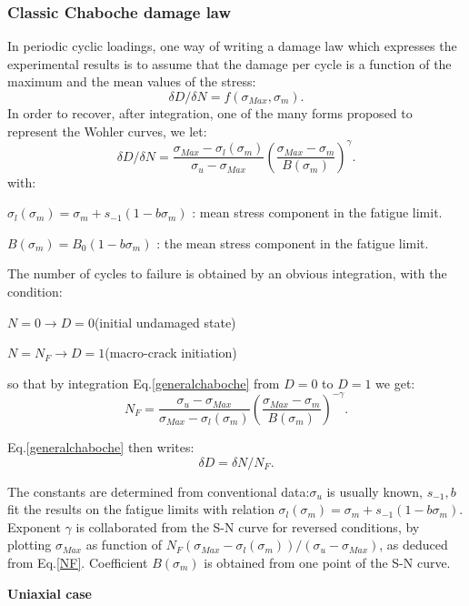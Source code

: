 \documentclass[3p,times,procedia,number]{elsarticle}
\begin{document}
\subsubsection{Classic Chaboche damage law}

In periodic cyclic loadings, one way of writing a damage law which expresses the experimental results is to assume that the damage per cycle is a function of the maximum and the mean values of the stress:
$$\delta D/\delta N=f(\sigma_{Max},\sigma_m).$$
In order to recover, after integration, one of the many forms proposed to represent the Wohler curves, we let:
\begin{equation}
\delta D/\delta N=\frac{\sigma_{Max}-\sigma_l(\sigma_m)}{\sigma_{u}-\sigma_{Max}}(\frac{\sigma_{Max}-\sigma_m}{B(\sigma_m)})^{\gamma}.
\label{generalchaboche}
\end{equation}
with:

$\sigma_l(\sigma_m)=\sigma_m+s_{-1}(1-b\sigma_m)$ : mean stress component in the fatigue limit.

$B(\sigma_m)=B_0(1-b\sigma_m)$ : the mean stress component in the fatigue limit.

The number of cycles to failure is obtained by an obvious integration, with the condition:

$N=0 \to D=0$(initial undamaged state)

$N=N_F \to D=1$(macro-crack initiation)

so that by integration Eq.\eqref{generalchaboche} from $D=0$ to $D=1$ we get:
\begin{equation}N_F=\frac{\sigma_{u}-\sigma_{Max}}{\sigma_{Max}-\sigma_l(\sigma_m)}\left(\frac{\sigma_{Max}-\sigma_m}{B(\sigma_m)}\right)^{-\gamma}.
\label{NF}
\end{equation}

Eq.\eqref{generalchaboche} then writes:
$$\delta D=\delta N/N_F.$$

The constants are determined from conventional data:$\sigma_u$ is usually known, $s_{-1},b$ fit the results on the fatigue limits with relation $\sigma_l(\sigma_m)=\sigma_m+s_{-1}(1-b\sigma_m)$. Exponent $\gamma$ is collaborated from the S-N curve for reversed conditions, by plotting $\sigma_{Max}$ as function of $N_F(\sigma_{Max}-\sigma_l(\sigma_m))/(\sigma_{u}-\sigma_{Max})$, as deduced from Eq.\eqref{NF}. Coefficient $B(\sigma_m)$ is obtained from one point of the S-N curve.

\vspace{6pt}
\textbf{Uniaxial case}
\vspace{6pt}
\end{document}
